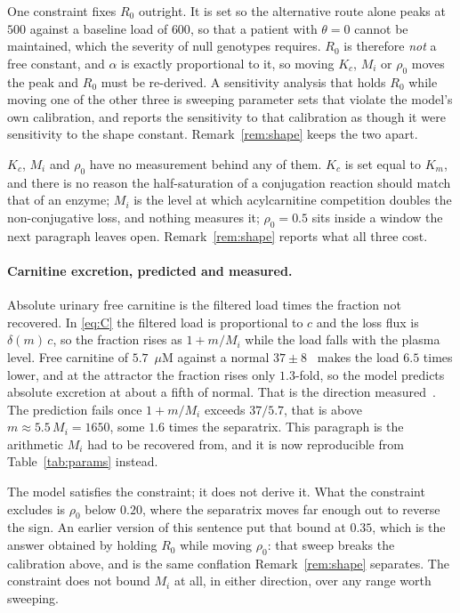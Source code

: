 One constraint fixes $R_0$ outright. It is set so the alternative route alone peaks at $500$
against a baseline load of $600$, so that a patient with $\theta = 0$ cannot be maintained,
which the severity of null genotypes requires. $R_0$ is therefore \emph{not} a free
constant, and $\alpha$ is exactly proportional to it, so moving $K_c$, $M_i$ or $\rho_0$
moves the peak and $R_0$ must be re-derived. A sensitivity analysis that holds $R_0$ while
moving one of the other three is sweeping parameter sets that violate the model's own
calibration, and reports the sensitivity to that calibration as though it were sensitivity
to the shape constant. Remark~\ref{rem:shape} keeps the two apart.

$K_c$, $M_i$ and $\rho_0$ have no measurement behind any of them. $K_c$ is set equal to
$K_m$, and there is no reason the half-saturation of a conjugation reaction should match that
of an enzyme; $M_i$ is the level at which acylcarnitine competition doubles the
non-conjugative loss, and nothing measures it; $\rho_0 = 0.5$ sits inside a window the next
paragraph leaves open. Remark~\ref{rem:shape} reports what all three cost.

\paragraph{Carnitine excretion, predicted and measured.}
Absolute urinary free carnitine is the filtered load times the fraction not recovered. In
\eqref{eq:C} the filtered load is proportional to $c$ and the loss flux is $\delta(m)\,c$,
so the fraction rises as $1 + m/M_i$ while the load falls with the plasma level. Free
carnitine of $5.7$~$\mu$M against a normal $37 \pm 8$~\cite{carnitine_pa_child} %
makes the load $6.5$ times lower, and at the attractor the fraction rises only $1.3$-fold,
so the model predicts absolute excretion at about a fifth of normal. That is the direction
measured~\cite{carnitine_excretion_pa}. %
The prediction fails once $1 + m/M_i$ exceeds $37/5.7$, that is above
$m \approx 5.5\,M_i = 1650$, some $1.6$ times the separatrix. This paragraph is the
arithmetic $M_i$ had to be recovered from, and it is now reproducible from
Table~\ref{tab:params} instead.

The model satisfies the constraint; it does not derive it. What the constraint excludes is
$\rho_0$ below $0.20$, where the separatrix moves far enough out to reverse the sign. An
earlier version of this sentence put that bound at $0.35$, which is the answer obtained by
holding $R_0$ while moving $\rho_0$: that sweep breaks the calibration above, and is the
same conflation Remark~\ref{rem:shape} separates. The constraint does not bound $M_i$ at
all, in either direction, over any range worth sweeping.

